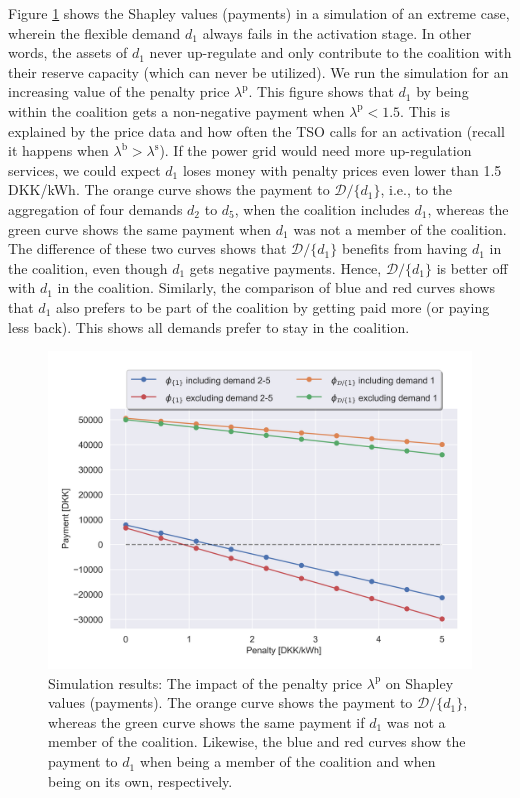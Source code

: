 \documentclass[conference]{IEEEtran}
\begin{document}
Figure \ref{fig:shapley_values} shows the Shapley values (payments) in a simulation of an extreme case, wherein the flexible demand $d_1$ always fails in the activation stage. In other words, the assets of $d_1$ never up-regulate and only contribute to the coalition with their reserve capacity (which can never be utilized). We run the simulation for an increasing value of the penalty price $\lambda^{\text{p}}$.
This figure shows that $d_1$ by being within the coalition gets a non-negative payment when $\lambda^{\text{p}} < 1.5$. This is explained by the price data and how often the TSO calls for an activation (recall it happens when $\lambda^{\text{b}} > \lambda^{\text{s}}$). If the power grid would need more up-regulation services, we could expect $d_1$ loses money with penalty prices even lower than 1.5 DKK/kWh. The orange curve shows the payment to $\mathcal{D} / \{d_1\}$, i.e., to the aggregation of four demands $d_2$ to $d_5$, when the coalition includes $d_1$, whereas the green curve shows the same payment when $d_1$ was not a member of the coalition. The difference of these two curves shows that  $\mathcal{D} / \{d_1\}$ benefits from having $d_1$ in the coalition, even though $d_1$ gets negative payments. Hence, $\mathcal{D} / \{d_1\}$ is better off with $d_1$ in the coalition. 
Similarly, the comparison of blue and red curves shows that $d_1$ also prefers to be part of the coalition by getting paid more (or paying less back). This shows all demands prefer to stay in the coalition. 



\begin{figure}[!t]
    \centering
    \includegraphics[width=\columnwidth]{figures/shapley_values.png}
    \caption{Simulation results: The impact of the penalty price $\lambda^{\text{p}}$ on
    Shapley values (payments). The orange curve shows the payment to $\mathcal{D} / \{d_1\}$, whereas the green curve shows the same payment if $d_1$ was not a member of the coalition. Likewise, the blue and red curves show the payment to $d_1$ when being a member of the coalition  and when being on its own, respectively.}
    \label{fig:shapley_values}
\end{figure}
\end{document}
